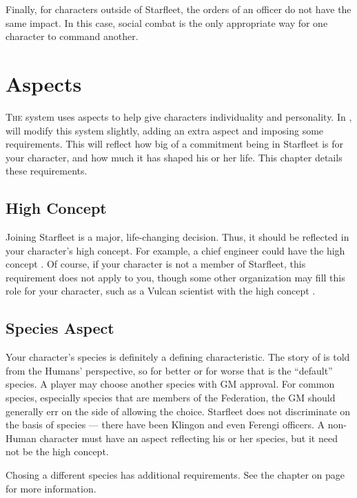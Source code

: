 \documentclass[12pt,titlepage,openany]{book}
\begin{document}
Finally, for characters outside of Starfleet, the orders of an officer do not
have the same impact. In this case, social combat is the only appropriate way
for one character to command another.



\chapter{Aspects}\label{chap:aspects}

\lettrine[lines=1]{T}{he} \FateCore{} system uses aspects to help give
characters individuality and personality. In \StarTrekFate{}, will modify this
system slightly, adding an extra aspect and imposing some requirements. This
will reflect how big of a commitment being in Starfleet is for your character,
and how much it has shaped his or her life. This chapter details these
requirements.

\section{High Concept}\label{sec:high-concept}

Joining Starfleet is a major, life-changing decision. Thus, it should be
reflected in your character's high concept. For example, a chief engineer could
have the high concept . Of course, if your character
is not a member of Starfleet, this requirement does not apply to you, though
some other organization may fill this role for your character, such as a Vulcan
scientist with the high concept .

\section{Species Aspect}\label{sec:species}

Your character's species is definitely a defining characteristic. The story of
\StarTrek{} is told from the Humans' perspective, so for better or for worse
that is the ``default'' species. A player may choose another species with GM
approval. For common species, especially species that are members of the
Federation, the GM should generally err on the side of allowing the choice.
Starfleet does not discriminate on the basis of species --- there have been
Klingon and even Ferengi officers. A non-Human character must have an aspect
reflecting his or her species, but it need not be the high concept.

Chosing a different species has additional requirements. See the chapter
 on page~\pageref{chap:species} for more information.
\end{document}
